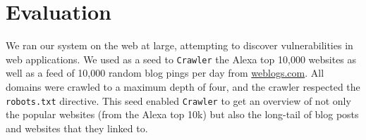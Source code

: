 
\section{Evaluation}

We ran our system on the web at large, attempting to discover \ehi
vulnerabilities in web applications. We used as a seed to
\texttt{Crawler} the Alexa top 10,000 websites as well as a feed of
10,000 random blog pings per day from \url{weblogs.com}. All domains
were crawled to a maximum depth of four, and the crawler respected the
\texttt{robots.txt} directive. This seed enabled \texttt{Crawler} to
get an overview of not only the popular websites (from the Alexa top
10k) but also the long-tail of blog posts and websites that they
linked to.



%






